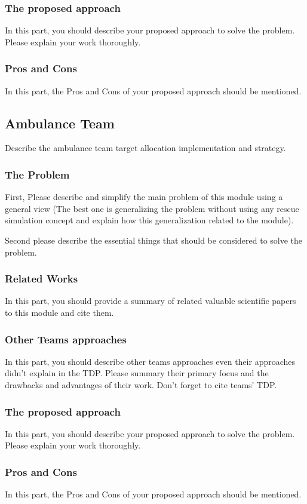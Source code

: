\documentclass[runningheads,a4paper]{llncs}
\begin{document}
\subsubsection{The proposed approach}
In this part, you should describe your proposed approach to solve the problem. Please explain your work thoroughly.
\subsubsection{Pros and Cons}
In this part, the Pros and Cons of your proposed approach should be mentioned.

\subsection{Ambulance Team}
Describe the ambulance team target allocation implementation and strategy.
\subsubsection{The Problem}
First, Please describe and simplify the main problem of this module using a general view (The best one is generalizing the problem without using any rescue simulation concept and explain how this generalization related to the module).

Second please describe the essential things that should be considered to solve the problem.
\subsubsection{Related Works}
In this part, you should provide a summary of related valuable scientific papers to this module and cite them.
\subsubsection{Other Teams approaches}
In this part, you should describe other teams approaches even their approaches didn't explain in the TDP. Please summary their primary focus and the drawbacks and advantages of their work. Don't forget to cite teams' TDP.
\subsubsection{The proposed approach}
In this part, you should describe your proposed approach to solve the problem. Please explain your work thoroughly.
\subsubsection{Pros and Cons}
In this part, the Pros and Cons of your proposed approach should be mentioned.
\end{document}
